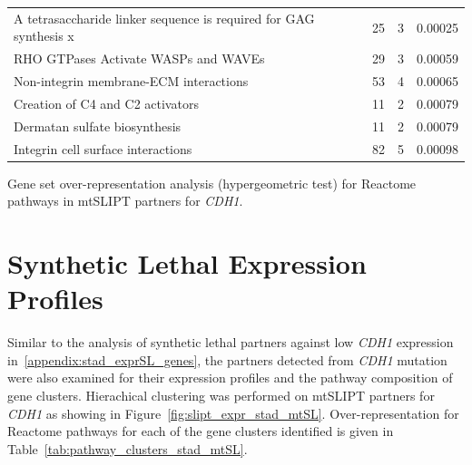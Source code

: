 \begin{table}[!ht]
{\begin{threeparttable}
\begin{tabular}{lccc}
  \rowcolor{black!10}
  A tetrasaccharide linker sequence is required for GAG synthesis \textcolor{black!10}{x} &  25 &   3 & 0.00025 \\ 
  \rowcolor{black!5}
  RHO GTPases Activate WASPs and WAVEs &  29 &   3 & 0.00059 \\ 
  \rowcolor{black!10}
  Non-integrin membrane-ECM interactions &  53 &   4 & 0.00065 \\ 
  \rowcolor{black!5}
  Creation of C4 and C2 activators &  11 &   2 & 0.00079 \\ 
  \rowcolor{black!10}
  Dermatan sulfate biosynthesis &  11 &   2 & 0.00079 \\ 
  \rowcolor{black!5}
  Integrin cell surface interactions &  82 &   5 & 0.00098 \\ 
  \hline
\end{tabular}
\begin{tablenotes}
\raggedright \small
Gene set over-representation analysis (hypergeometric test) for Reactome pathways in \acrshort{mtSLIPT} partners for \textit{CDH1}.
\end{tablenotes}
\end{threeparttable}
}
\end{table}


\FloatBarrier

\section{Synthetic Lethal Expression Profiles} \label{appendix:stad_mtSL_clusters}

Similar to the analysis of synthetic lethal partners against low \textit{CDH1} expression in~\ref{appendix:stad_exprSL_genes}, the partners detected from \textit{CDH1} mutation were also examined for their expression profiles and the pathway composition of gene clusters. Hierachical clustering was performed on \acrshort{mtSLIPT} partners for \textit{CDH1} as showing in Figure~\ref{fig:slipt_expr_stad_mtSL}. Over-representation for Reactome pathways for each of the gene clusters identified is given in Table~\ref{tab:pathway_clusters_stad_mtSL}.



